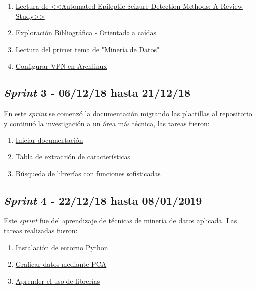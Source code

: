 \begin{enumerate}\addtocounter{enumi}{2}
	\item \href{https://github.com/joselucross/TFG-SmartBeds/issues/3}{Lectura de <<Automated Epileptic Seizure Detection Methods: A Review Study>>}
	\item \href{https://github.com/joselucross/TFG-SmartBeds/issues/4}{Exploración Bibliográfica - Orientado a caídas}
	\item \href{https://github.com/joselucross/TFG-SmartBeds/issues/5}{ Lectura del primer tema de "Minería de Datos"}
	\item \href{https://github.com/joselucross/TFG-SmartBeds/issues/6}{ Configurar VPN en Archlinux}
\end{enumerate}

\subsection{\textit{Sprint} 3 - 06/12/18 hasta 21/12/18}
En este \textit{sprint} se comenzó la documentación migrando las plantillas al repositorio y continuó la investigación a un área más técnica, las tareas fueron:

\begin{enumerate}\addtocounter{enumi}{6}
	\item \href{https://github.com/joselucross/TFG-SmartBeds/issues/7}{Iniciar documentación}
	\item \href{https://github.com/joselucross/TFG-SmartBeds/issues/8}{Tabla de extracción de características}
	\item \href{https://github.com/joselucross/TFG-SmartBeds/issues/9}{ Búsqueda de librerías con funciones sofisticadas}
	
\end{enumerate}

\subsection{\textit{Sprint} 4 - 22/12/18 hasta 08/01/2019}
Este \textit{sprint} fue del aprendizaje de técnicas de minería de datos aplicada. Las tareas realizadas fueron:

\begin{enumerate}\addtocounter{enumi}{9}
	\item \href{https://github.com/joselucross/TFG-SmartBeds/issues/10}{ Instalación de entorno Python}
	\item \href{https://github.com/joselucross/TFG-SmartBeds/issues/11}{ Graficar datos mediante PCA}
	\item \href{https://github.com/joselucross/TFG-SmartBeds/issues/12}{ Aprender el uso de librerías}
\end{enumerate}

